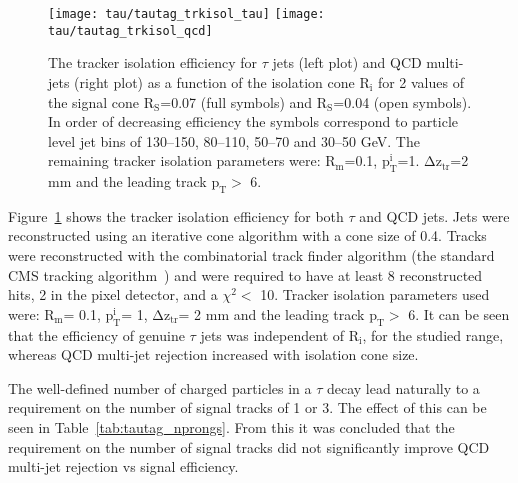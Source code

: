 \begin{figure}[tb]
  \centering
  \texttt{[image: tau/tautag\_trkisol\_tau]}
  \texttt{[image: tau/tautag\_trkisol\_qcd]}
  \caption{The tracker isolation efficiency for $\tau$ jets (left plot) and
          QCD multi-jets (right plot) as a function of the isolation cone
          $\mathrm{R_{i}}$ for 2 values of the signal cone
          $\mathrm{R_{S}}$=0.07 (full symbols) and  $\mathrm{R_{S}}$=0.04
         (open symbols). In order of decreasing efficiency the symbols
          correspond to particle level jet \ETMC bins of 130--150, 80--110,
          50--70 and 30--50 GeV. The remaining tracker isolation parameters were:
          $\mathrm{R_{m}}$=0.1, $\mathrm{p_{T}^{i}}$=1\GeVc .
          $\mathrm{\Delta z_{tr}}$=2 mm and the leading track
          $\mathrm{p_{T}}>$ 6\GeVc.~\cite{CMS_TDR_PHYS_vol1, citeulike:800614}
  \label{fig:tautag_trkisol}}
\end{figure}

Figure~\ref{fig:tautag_trkisol} shows the tracker isolation efficiency for both $\tau$ and QCD jets. Jets were reconstructed using an iterative cone algorithm with a cone size of 0.4. Tracks were reconstructed with the combinatorial track finder algorithm (the standard CMS tracking algorithm~\cite{CMS_TRKTDR}) and were required to have at least 8 reconstructed hits, 2 in the pixel detector, and a $\chi^{2} < $ 10. Tracker isolation parameters used were: $\mathrm{R_{m}}$= 0.1, $\mathrm{p_{T}^{i}}$= 1\GeVc, $\mathrm{\Delta z_{tr}}$= 2 mm and the leading track $\mathrm{p_{T}}>$ 6\GeVc. It can be seen that the efficiency of genuine $\tau$ jets was independent of $\mathrm{R_{i}}$, for the studied range, whereas QCD multi-jet rejection increased with isolation cone size. 

The well-defined number of charged particles in a $\tau$ decay lead naturally to a requirement on the number of signal tracks of 1 or 3. The effect of this can be seen in Table~\ref{tab:tautag_nprongs}. From this it was concluded that the requirement on the number of signal tracks did not significantly improve QCD multi-jet rejection vs signal efficiency.

